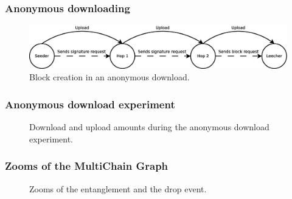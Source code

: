 \documentclass{beamer}
\begin{document}
\begin{frame}
\frametitle{Anonymous downloading}

\begin{figure}
	\centerline{\includegraphics[scale=0.25]{images/experimentation/seeder-hops-downloader.eps}}
	\caption{Block creation in an anonymous download.}
	\end{figure}
\end{frame}

\begin{frame}
\frametitle{Anonymous download experiment}

\begin{figure}
    \centering
    \begin{adjustwidth}{-3em}{-3em}
    \hspace{0em}%
    \end{adjustwidth}
    \caption{Download and upload amounts during the anonymous download experiment.}
\end{figure}

\end{frame}

\begin{frame}
\frametitle{Zooms of the MultiChain Graph}
\begin{figure}
    \centering
    \begin{adjustwidth}{-3em}{-3em}
    \hspace{0em}%
    \pause{}
    \end{adjustwidth}
    \caption{Zooms of the entanglement and the drop event.}
\end{figure}
\end{frame}
\end{document}

